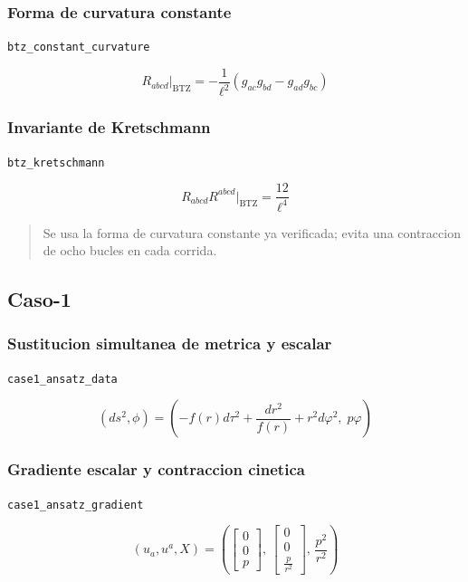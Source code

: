 \documentclass[11pt,a4paper]{article}
\begin{document}
\subsubsection{Forma de curvatura constante}

\noindent\texttt{btz\_constant\_curvature}\par\nopagebreak[4]

\[
R_{abcd}\big|_{\mathrm{BTZ}} = -\frac{1}{\ell^2}(g_{ac}g_{bd}-g_{ad}g_{bc})
\]

\subsubsection{Invariante de Kretschmann}

\noindent\texttt{btz\_kretschmann}\par\nopagebreak[4]

\[
R_{abcd}R^{abcd}\big|_{\mathrm{BTZ}} = \frac{12}{\ell^4}
\]

\begin{quote}\small Se usa la forma de curvatura constante ya verificada; evita una contraccion de ocho bucles en cada corrida.\end{quote}

\subsection{Caso-1}

\subsubsection{Sustitucion simultanea de metrica y escalar}

\noindent\texttt{case1\_ansatz\_data}\par\nopagebreak[4]

\[
(ds^2,\phi) = \left(-f(r)d\tau^2+\frac{dr^2}{f(r)}+r^2d\varphi^2,\;p\varphi\right)
\]

\subsubsection{Gradiente escalar y contraccion cinetica}

\noindent\texttt{case1\_ansatz\_gradient}\par\nopagebreak[4]

\[
(u_a,u^a,X) = \left(\left[\begin{matrix}0\\0\\p\end{matrix}\right],\,\left[\begin{matrix}0\\0\\\frac{p}{r^{2}}\end{matrix}\right],\,\frac{p^{2}}{r^{2}}\right)
\]
\end{document}
